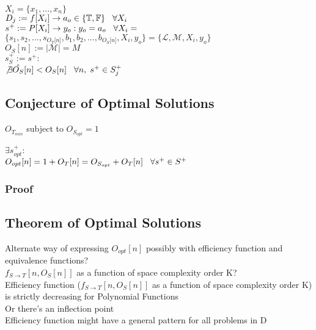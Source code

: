 \documentclass[11pt]{article}
\begin{document}
\begin{center}
$
X_i = \{x_1,...,x_n\}
$
\\ \vspace{2mm}
$
D_j := f \lbrack X_i \rbrack \rightarrow a_{o} \in \{\mathbb{T}, \mathbb{F}\} \hspace{3mm} \forall X_i
$
\\ \vspace{2mm}
$
s^+ := P \lbrack X_i \rbrack \rightarrow y_{o} : y_o = a_{o} \hspace{3mm} \forall X_i = 
$
\\ \vspace{2mm}
$
\{ s_1,s_2,...,s_{O_T \lbrack n \rbrack }, b_1, b_2,...,b_{O_S \lbrack n \rbrack},X_i,y_o \} = \{ \mathcal{L},\mathcal{M},X_i,y_o\}
$
\\ \vspace{3mm}
$
O_S[n] := |\mathcal{M}| = M
$
\\ \vspace{2mm}
$
s_{S}^+ := s^+ :
$
\\ \vspace{2mm}
$
\not \exists \hat{O_S} \lbrack n \rbrack < O_{S}[n] \hspace{3mm} \forall n, \hspace{1mm}  s^+ \in S_j^+
$
\end{center}







\subsection{Conjecture of Optimal Solutions}
$O_{T_{min}}$ subject to $O_{S_{opt}} = 1$
\begin{center}
$
\exists s^+_{opt} :
$
\\ \vspace{2mm}
$
O_{opt}[n] = 1 + O_T[n] = O_{S_{opt}} + O_T[n] \hspace{3mm} \forall s^+ \in S^+
$
\end{center}
\subsubsection{Proof}




\subsection{Theorem of Optimal Solutions}
Alternate way of expressing $O_{opt}[n]$ possibly with efficiency function and equivalence functions?\\
$f_{S \rightarrow T}[n,O_S[n]]$ as a function of space complexity order K?\\
Efficiency function ($f_{S \rightarrow T}[n,O_S[n]]$ as a function of space complexity order K) is strictly decreasing for Polynomial Functions\\
Or there's an inflection point\\
Efficiency function might have a general pattern for all problems in D
\end{document}
